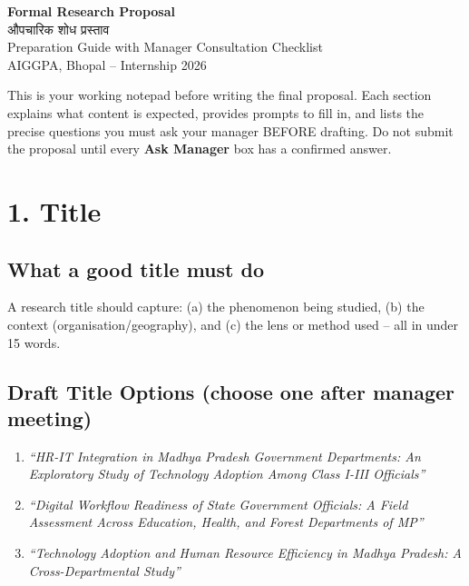 \documentclass[12pt,a4paper]{article}
\newcommand{\hindi}[1]{{\hindifont #1}}
\begin{document}
\begin{center}
{\LARGE\bfseries\color{govblue} Formal Research Proposal}\\[0.4cm]
{\large\color{govblue} \hindi{औपचारिक शोध प्रस्ताव}}\\[0.3cm]
{\normalsize Preparation Guide with Manager Consultation Checklist}\\
{\small AIGGPA, Bhopal -- Internship 2026}
\end{center}

\vspace{0.3cm}
\begin{tcolorbox}[colback=alertred!10,colframe=alertred,title=\textbf{How to use this document},fonttitle=\small\bfseries]
\small This is your working notepad before writing the final proposal. Each section explains what content is expected, provides prompts to fill in, and lists the precise questions you must ask your manager BEFORE drafting. Do not submit the proposal until every \textbf{Ask Manager} box has a confirmed answer.
\end{tcolorbox}

\vspace{0.5cm}

\section{1. Title}

\subsection{What a good title must do}
A research title should capture: (a) the phenomenon being studied, (b) the context (organisation/geography), and (c) the lens or method used -- all in under 15 words.

\subsection{Draft Title Options (choose one after manager meeting)}
\begin{enumerate}[leftmargin=1.5em]
  \item \textit{``HR-IT Integration in Madhya Pradesh Government Departments: An Exploratory Study of Technology Adoption Among Class I-III Officials''}
  \item \textit{``Digital Workflow Readiness of State Government Officials: A Field Assessment Across Education, Health, and Forest Departments of MP''}
  \item \textit{``Technology Adoption and Human Resource Efficiency in Madhya Pradesh: A Cross-Departmental Study''}
\end{enumerate}
\end{document}
